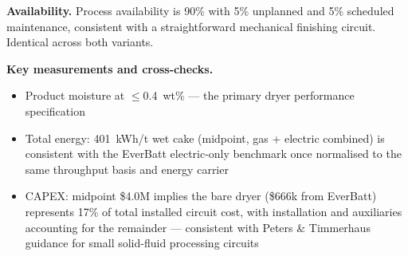 \medskip
\noindent\textbf{Availability.}\quad
Process availability is 90\% with 5\% unplanned and 5\% scheduled maintenance, consistent with a straightforward mechanical finishing circuit. Identical across both variants.
 
\medskip
\noindent\textbf{Key measurements and cross-checks.}\quad
\begin{itemize}[noitemsep]
	\item Product moisture at $\leq$0.4~wt\% --- the primary dryer performance specification
	\item Total energy: 401~kWh/t wet cake (midpoint, gas + electric combined) is consistent with the EverBatt electric-only benchmark once normalised to the same throughput basis and energy carrier
	\item CAPEX: midpoint \$4.0M implies the bare dryer (\$666k from EverBatt) represents 17\% of total installed circuit cost, with installation and auxiliaries accounting for the remainder --- consistent with Peters \& Timmerhaus guidance for small solid-fluid processing circuits
\end{itemize}